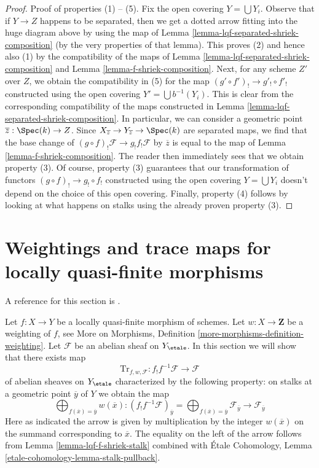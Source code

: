 \begin{proof}
\medskip\noindent
Proof of properties (1) -- (5). Fix the open covering $Y = \bigcup Y_i$.
Observe that if $Y \to Z$ happens to be separated, then we get a dotted
arrow fitting into the huge diagram above by using the map of
Lemma \ref{lemma-lqf-separated-shriek-composition}
(by the very properties of that lemma).
This proves (2) and hence also (1) by the compatibility of the
maps of Lemma \ref{lemma-lqf-separated-shriek-composition}
and Lemma \ref{lemma-f-shriek-composition}.
Next, for any scheme $Z'$ over $Z$, we obtain the compatibility in (5)
for the map $(g' \circ f')_! \to g'_! \circ f'_!$
constructed using the open covering $Y' = \bigcup b^{-1}(Y_i)$.
This is clear from the corresponding compatibility of the maps
constructed in Lemma \ref{lemma-lqf-separated-shriek-composition}.
In particular, we can consider a geometric point
$\overline{z} : \Spec(k) \to Z$. Since
$X_{\overline{z}} \to Y_{\overline{z}} \to \Spec(k)$
are separated maps, we find that the base change of
$(g \circ f)_!\mathcal{F} \to g_! f_! \mathcal{F}$
by $\overline{z}$ is equal to the map of
Lemma \ref{lemma-f-shriek-composition}.
The reader then immediately sees that we obtain property (3).
Of course, property (3) guarantees that our transformation of functors
$(g \circ f)_! \to g_! \circ f_!$ constructed using the open covering
$Y = \bigcup Y_i$ doesn't depend on the choice of this open covering.
Finally, property (4) follows by looking at what happens on stalks
using the already proven property (3).
\end{proof}








\section{Weightings and trace maps for locally quasi-finite morphisms}
\label{section-weightings}

\noindent
A reference for this section is
\cite[Exposee XVII, Proposition 6.2.5]{SGA4}.

\medskip\noindent
Let $f : X \to Y$ be a locally quasi-finite morphism of schemes.
Let $w : X \to \mathbf{Z}$ be a weighting of $f$, see
More on Morphisms, Definition \ref{more-morphisms-definition-weighting}.
Let $\mathcal{F}$ be an abelian sheaf on $Y_\etale$.
In this section we will show that there exists map
$$
\text{Tr}_{f, w, \mathcal{F}} :
f_!f^{-1}\mathcal{F}
\longrightarrow
\mathcal{F}
$$
of abelian sheaves on $Y_\etale$ characterized by the following property:
on stalks at a geometric point $\overline{y}$ of $Y$ we obtain the map
$$
\bigoplus\nolimits_{f(\overline{x}) = \overline{y}} w(\overline{x}) :
(f_!f^{-1}\mathcal{F})_{\overline{y}} =
\bigoplus\nolimits_{f(\overline{x}) = \overline{y}}
\mathcal{F}_{\overline{y}}
\longrightarrow
\mathcal{F}_{\overline{y}}
$$
Here as indicated the arrow is given by multiplication by the integer
$w(\overline{x})$ on the summand corresponding to $\overline{x}$.
The equality on the left of the arrow follows from
Lemma \ref{lemma-lqf-f-shriek-stalk} combined with
\'Etale Cohomology, Lemma \ref{etale-cohomology-lemma-stalk-pullback}.

